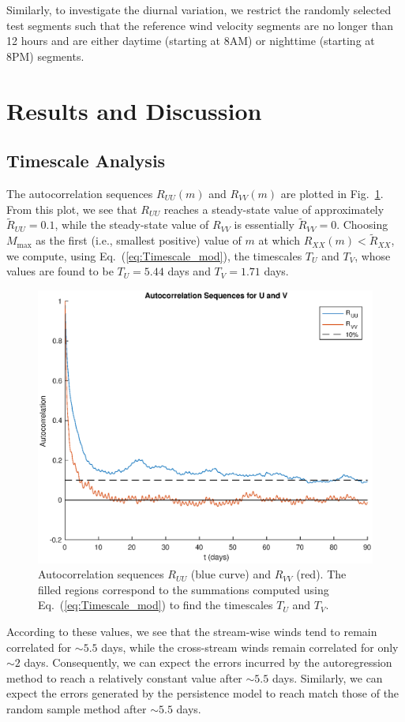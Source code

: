 \documentclass[11pt, oneside]{article}
\newcommand{\figref}[1]{Fig.~\ref{#1}}
\newcommand{\eqnref}[1]{Eq.~(\ref{#1})}
\begin{document}
Similarly, to investigate the diurnal variation, we restrict the randomly selected test segments such that the reference wind velocity segments are no longer than 12 hours and are either daytime (starting at 8AM) or nighttime (starting at 8PM) segments.

\section{Results and Discussion}\label{sec:Results}

\subsection{Timescale Analysis}\label{sec:Results:Timescale}
The autocorrelation sequences $R_{UU}(m)$ and $R_{VV}(m)$ are plotted in \figref{fig:Autocorrelations}.
From this plot, we see that $R_{UU}$ reaches a steady-state value of approximately $\tilde{R}_{UU} = 0.1$, while the steady-state value of $R_{VV}$ is essentially $\tilde{R}_{VV} = 0$.
Choosing $M_\text{max}$ as the first (i.e., smallest positive) value of $m$ at which $R_{XX}(m) < \tilde{R}_{XX}$, we compute, using \eqnref{eq:Timescale_mod}, the timescales $T_U$ and $T_V$,
whose values are found to be $T_U = 5.44$ days and $T_V = 1.71$ days.

\begin{figure}[htb]
\centering
\includegraphics[width=0.7\columnwidth]{figures/AutocorrelationSequences_90days}
\caption{Autocorrelation sequences $R_{UU}$ (blue curve) and $R_{VV}$ (red).
The filled regions correspond to the summations computed using \eqnref{eq:Timescale_mod} to find the timescales $T_U$ and $T_V$.}
\label{fig:Autocorrelations}
\end{figure}

According to these values, we see that the stream-wise winds tend to remain correlated for $\sim 5.5$ days, while the cross-stream winds remain correlated for only $\sim 2$ days.
Consequently, we can expect the errors incurred by the autoregression method to reach a relatively constant value after $\sim 5.5$ days.
Similarly, we can expect the errors generated by the persistence model to reach match those of the random sample method after $\sim 5.5$ days.
\end{document}
